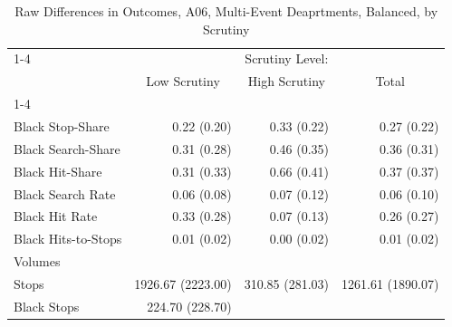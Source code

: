 \begin{table}[!h]
\caption{Raw Differences in Outcomes, A06, Multi-Event Deaprtments, Balanced, by Scrutiny}
\centering
\begin{tabular}{llll}
\cline{1-4}
\multicolumn{1}{r}{} &
  \multicolumn{3}{c}{Scrutiny Level:} \\
\multicolumn{1}{r}{} &
  \multicolumn{1}{c}{Low Scrutiny} &
  \multicolumn{1}{c}{High Scrutiny} &
  \multicolumn{1}{c}{Total} \\
\cline{1-4}
\multicolumn{1}{l}{Rates} &
  \multicolumn{1}{r}{} &
  \multicolumn{1}{r}{} &
  \multicolumn{1}{r}{} \\
\multicolumn{1}{l}{\hspace{1em}Black Stop-Share} &
  \multicolumn{1}{r}{0.22 (0.20)} &
  \multicolumn{1}{r}{0.33 (0.22)} &
  \multicolumn{1}{r}{0.27 (0.22)} \\
\multicolumn{1}{l}{\hspace{1em}Black Search-Share} &
  \multicolumn{1}{r}{0.31 (0.28)} &
  \multicolumn{1}{r}{0.46 (0.35)} &
  \multicolumn{1}{r}{0.36 (0.31)} \\
\multicolumn{1}{l}{\hspace{1em}Black Hit-Share} &
  \multicolumn{1}{r}{0.31 (0.33)} &
  \multicolumn{1}{r}{0.66 (0.41)} &
  \multicolumn{1}{r}{0.37 (0.37)} \\
\multicolumn{1}{l}{\hspace{1em}Black Search Rate} &
  \multicolumn{1}{r}{0.06 (0.08)} &
  \multicolumn{1}{r}{0.07 (0.12)} &
  \multicolumn{1}{r}{0.06 (0.10)} \\
\multicolumn{1}{l}{\hspace{1em}Black Hit Rate} &
  \multicolumn{1}{r}{0.33 (0.28)} &
  \multicolumn{1}{r}{0.07 (0.13)} &
  \multicolumn{1}{r}{0.26 (0.27)} \\
\multicolumn{1}{l}{\hspace{1em}Black Hits-to-Stops} &
  \multicolumn{1}{r}{0.01 (0.02)} &
  \multicolumn{1}{r}{0.00 (0.02)} &
  \multicolumn{1}{r}{0.01 (0.02)} \\
\multicolumn{1}{l}{Volumes} &
  \multicolumn{1}{r}{} &
  \multicolumn{1}{r}{} &
  \multicolumn{1}{r}{} \\
\multicolumn{1}{l}{\hspace{1em}Stops} &
  \multicolumn{1}{r}{1926.67 (2223.00)} &
  \multicolumn{1}{r}{310.85 (281.03)} &
  \multicolumn{1}{r}{1261.61 (1890.07)} \\
\multicolumn{1}{l}{\hspace{1em}Black Stops} &
  \multicolumn{1}{r}{224.70 (228.70)} &

\end{tabular}
\end{table}

